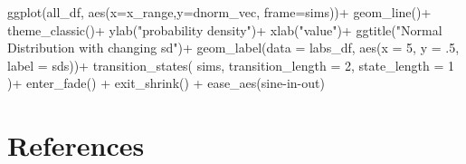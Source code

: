 \documentclass[
  letterpaper,
  DIV=11,
  numbers=noendperiod]{scrreprt}
\newenvironment{Shaded}{\begin{snugshade}}{\end{snugshade}}
\newcommand{\AttributeTok}[1]{\textcolor[rgb]{0.40,0.45,0.13}{#1}}
\newcommand{\DecValTok}[1]{\textcolor[rgb]{0.68,0.00,0.00}{#1}}
\newcommand{\FunctionTok}[1]{\textcolor[rgb]{0.28,0.35,0.67}{#1}}
\newcommand{\NormalTok}[1]{\textcolor[rgb]{0.00,0.23,0.31}{#1}}
\newcommand{\SpecialCharTok}[1]{\textcolor[rgb]{0.37,0.37,0.37}{#1}}
\newcommand{\StringTok}[1]{\textcolor[rgb]{0.13,0.47,0.30}{#1}}
\begin{document}
\begin{Shaded}
\begin{Highlighting}[]
\FunctionTok{ggplot}\NormalTok{(all\_df, }\FunctionTok{aes}\NormalTok{(}\AttributeTok{x=}\NormalTok{x\_range,}\AttributeTok{y=}\NormalTok{dnorm\_vec, }\AttributeTok{frame=}\NormalTok{sims))}\SpecialCharTok{+}
  \FunctionTok{geom\_line}\NormalTok{()}\SpecialCharTok{+}
  \FunctionTok{theme\_classic}\NormalTok{()}\SpecialCharTok{+}
  \FunctionTok{ylab}\NormalTok{(}\StringTok{"probability density"}\NormalTok{)}\SpecialCharTok{+}
  \FunctionTok{xlab}\NormalTok{(}\StringTok{"value"}\NormalTok{)}\SpecialCharTok{+}
  \FunctionTok{ggtitle}\NormalTok{(}\StringTok{"Normal Distribution with changing sd"}\NormalTok{)}\SpecialCharTok{+}
  \FunctionTok{geom\_label}\NormalTok{(}\AttributeTok{data =}\NormalTok{ labs\_df, }\FunctionTok{aes}\NormalTok{(}\AttributeTok{x =} \DecValTok{5}\NormalTok{, }\AttributeTok{y =}\NormalTok{ .}\DecValTok{5}\NormalTok{, }\AttributeTok{label =}\NormalTok{ sds))}\SpecialCharTok{+}
   \FunctionTok{transition\_states}\NormalTok{(}
\NormalTok{    sims,}
    \AttributeTok{transition\_length =} \DecValTok{2}\NormalTok{,}
    \AttributeTok{state\_length =} \DecValTok{1}
\NormalTok{  )}\SpecialCharTok{+}
  \FunctionTok{enter\_fade}\NormalTok{() }\SpecialCharTok{+} 
  \FunctionTok{exit\_shrink}\NormalTok{() }\SpecialCharTok{+}
  \FunctionTok{ease\_aes}\NormalTok{(}\StringTok{\textquotesingle{}sine{-}in{-}out\textquotesingle{}}\NormalTok{)}
\end{Highlighting}
\end{Shaded}


\chapter*{References}\label{references}

\end{document}
